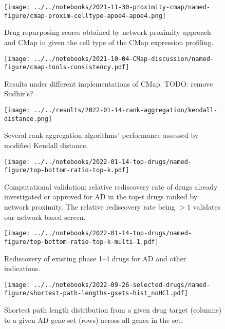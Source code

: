 \documentclass[letterpaper]{article}
\begin{document}
\begin{figure}[p]
\texttt{[image: ../../notebooks/2021-11-30-proximity-cmap/named-figure/cmap-proxim-celltype-apoe4-apoe4.png]}
\caption{
Drug repurposing scores obtained by network proximity approach and CMap in
given the cell type of the CMap expression profiling.
}
\label{fig:proxim-cmap-celltype}
\end{figure}

\begin{figure}[p]
\texttt{[image: ../../notebooks/2021-10-04-CMap-discussion/named-figure/cmap-tools-consistency.pdf]}
\caption{
Results under different implementations of CMap.
TODO: remove Sudhir's?
}
\label{fig:cmap-cmap}
\end{figure}

\begin{figure}[p]
\texttt{[image: ../../results/2022-01-14-rank-aggregation/kendall-distance.png]}
\caption{
Several rank aggregation algorithms' performance assessed by modified Kendall
distance.
}
\label{fig:kendall-dist}
\end{figure}

\begin{figure}[p]
\texttt{[image: ../../notebooks/2022-01-14-top-drugs/named-figure/top-bottom-ratio-top-k.pdf]}
\caption{
Computational validation: relative rediscovery rate of drugs already investigated or
approved for AD in the top-$t$ drugs ranked by network proximity.  The relative
rediscovery rate being $>1$ validates our network based screen.
}
\label{fig:ad-drug-rediscovery}
\end{figure}

\begin{figure}[p]
\texttt{[image: ../../notebooks/2022-01-14-top-drugs/named-figure/top-bottom-ratio-top-k-multi-1.pdf]}
\caption{
Rediscovery of existing phase 1--4 drugs for AD and other indications.
}
\label{fig:ad-drug-rediscovery-multi}
\end{figure}

\begin{figure}[p]
\texttt{[image: ../../notebooks/2022-09-26-selected-drugs/named-figure/shortest-path-lengths-gsets-hist\_noHCl.pdf]}
\caption{
  Shortest path length distribution from a given drug target (columns) to a given AD gene
  set (rows) across all genes in the set.
}
\label{fig:shortest-path-lengths}
\end{figure}
\end{document}
